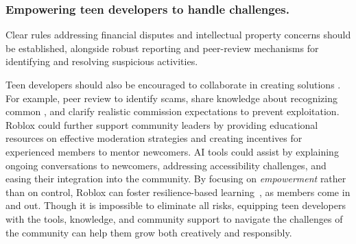 \subsubsection{\textbf{Empowering teen developers to handle challenges.}}
 Clear rules addressing financial disputes and intellectual property concerns should be established, alongside robust reporting and peer-review mechanisms for identifying and resolving suspicious activities. 

Teen developers should also be encouraged to collaborate in creating solutions . For example, peer review  to identify scams, share knowledge about recognizing common , and clarify realistic commission expectations to prevent exploitation. Roblox could further support community leaders by providing educational resources on effective moderation strategies and creating incentives for experienced members to mentor newcomers. AI tools could assist by explaining ongoing conversations to newcomers, addressing accessibility challenges, and easing their integration into the community. By focusing on \textit{empowerment}  rather than on control, Roblox can foster resilience-based learning~\cite{park2023towards},  as members come in and out. Though it is impossible to eliminate all risks, equipping teen developers with the tools, knowledge, and community support to navigate the challenges of the community can help them grow both creatively and responsibly.


